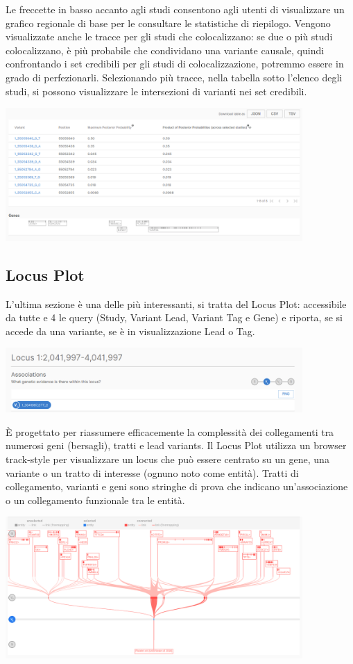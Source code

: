 \documentclass{article}
\begin{document}
Le freccette in basso accanto agli studi consentono agli utenti di visualizzare un grafico regionale di base per le consultare le statistiche di riepilogo. Vengono visualizzate anche le tracce per gli studi che colocalizzano: se due o più studi colocalizzano, è più probabile che condividano una variante causale, quindi confrontando i set credibili per gli studi di colocalizzazione, potremmo essere in grado di perfezionarli.
Selezionando più tracce, nella tabella sotto l'elenco degli studi, si possono visualizzare le intersezioni di varianti nei set credibili.
\begin{center}
    \includegraphics[width=0.85\textwidth]{figures/StudyLocus6.png}
\end{center}
\subsection{Locus Plot}
L'ultima sezione è una delle più interessanti, si tratta del Locus Plot:  accessibile da tutte e 4 le query (Study, Variant Lead, Variant Tag e Gene) e riporta, se si accede da una variante, se è in visualizzazione Lead o Tag.
\begin{center}
    \includegraphics[width=0.85\textwidth]{figures/16-LocusPlot.png}
\end{center}
È progettato per riassumere efficacemente la complessità dei collegamenti tra numerosi geni (bersagli), tratti e lead variants. Il Locus Plot utilizza un browser track-style per visualizzare un locus che può essere centrato su un gene, una variante o un tratto di interesse (ognuno noto come entità). Tratti di collegamento, varianti e geni sono stringhe di prova che indicano un'associazione o un collegamento funzionale tra le entità.
\begin{center}
    \includegraphics[width=0.85\textwidth]{figures/17-LocusPlot.png}
\end{center}
\end{document}
